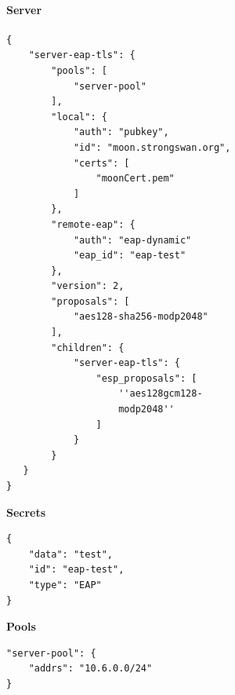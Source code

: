 \begin{minipage}[t]{0.5\textwidth}
\vspace{0pt}
\paragraph{Server}\mbox{}\medskip
\begin{lstlisting}[style=BashInputStyle]
{
    "server-eap-tls": {
        "pools": [
            "server-pool"
        ],
        "local": {
            "auth": "pubkey",
            "id": "moon.strongswan.org",
            "certs": [
                "moonCert.pem"
            ]
        },
        "remote-eap": {
            "auth": "eap-dynamic"
            "eap_id": "eap-test"
        },
        "version": 2,
        "proposals": [
            "aes128-sha256-modp2048"
        ],
        "children": {
            "server-eap-tls": {
                "esp_proposals": [
                    ''aes128gcm128-
                    modp2048''
                ]
            }
        }
   }
}
\end{lstlisting}
\hspace*{18pt}\textbf{Secrets}\mbox{}\medskip
\begin{lstlisting}[style=BashInputStyle]
{
    "data": "test",
    "id": "eap-test",
    "type": "EAP"
}
\end{lstlisting}
\hspace*{18pt}\textbf{Pools}\mbox{}\medskip
\begin{lstlisting}[style=BashInputStyle]
"server-pool": {
    "addrs": "10.6.0.0/24"
}
\end{lstlisting}
\end{minipage}
\newpage


